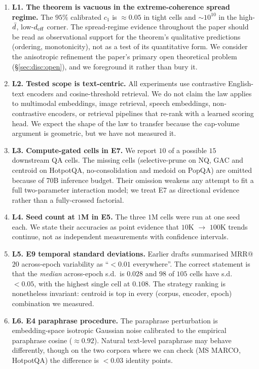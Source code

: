 \begin{enumerate}[leftmargin=1.8em, itemsep=4pt]
\item \textbf{L1. The theorem is vacuous in the extreme-coherence
spread regime.} The $95\%$ calibrated $c_1$ is $\approx 0.05$ in tight cells
and $\sim 10^{10}$ in the high-$\bar{d}$, low-${d_{\mathrm{eff}}}$ corner. The
spread-regime evidence throughout the paper should be read as
observational support for the theorem's qualitative predictions
(ordering, monotonicity), not as a test of its quantitative form.
We consider the anisotropic refinement the paper's primary open
theoretical problem (\S\ref{sec:disc:open}), and we foreground it
rather than bury it.

\item \textbf{L2. Tested scope is text-centric.} All experiments use
contrastive English-text encoders and cosine-threshold retrieval.
We do not claim the law applies to multimodal embeddings, image
retrieval, speech embeddings, non-contrastive encoders, or
retrieval pipelines that re-rank with a learned scoring head. We
expect the shape of the law to transfer because the cap-volume
argument is geometric, but we have not measured it.

\item \textbf{L3. Compute-gated cells in E7.} We report $10$ of a
possible $15$ downstream QA cells. The missing cells
(selective-prune on NQ, GAC and centroid on HotpotQA,
no-consolidation and medoid on PopQA) are omitted because of
70B inference budget. Their omission weakens any attempt to fit a
full two-parameter interaction model; we treat E7 as directional
evidence rather than a fully-crossed factorial.

\item \textbf{L4. Seed count at $1$M in E5.} The three $1$M cells
were run at one seed each. We state their accuracies as point
evidence that $10$K $\to$ $100$K trends continue, not as
independent measurements with confidence intervals.

\item \textbf{L5. E9 temporal standard deviations.} Earlier drafts
summarised MRR@$20$ across-epoch variability as ``$<0.01$
everywhere''. The correct statement is that the \emph{median}
across-epoch s.d.\ is $0.028$ and $98$ of $105$ cells have s.d.\
$<0.05$, with the highest single cell at $0.108$. The strategy
ranking is nonetheless invariant: centroid is top in every
(corpus, encoder, epoch) combination we measured.

\item \textbf{L6. E4 paraphrase procedure.} The paraphrase
perturbation is embedding-space isotropic Gaussian noise calibrated
to the empirical paraphrase cosine ($\approx 0.92$). Natural
text-level paraphrase may behave differently, though on the two
corpora where we can check (MS MARCO, HotpotQA) the difference is
$< 0.03$ identity points.
\end{enumerate}

